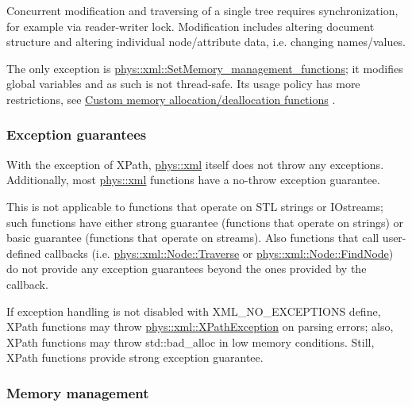 Concurrent modification and traversing of a single tree requires synchronization, for example via reader-\/writer lock. Modification includes altering document structure and altering individual node/attribute data, i.e. changing names/values. \par
 \par
 The only exception is \hyperlink{namespacephys_1_1xml_a2ad88e4331ac29a86c99d5e40b31f983}{phys::xml::SetMemory\_\-management\_\-functions}; it modifies global variables and as such is not thread-\/safe. Its usage policy has more restrictions, see \hyperlink{XMLManual_XMLCustomAlloc}{Custom memory allocation/deallocation functions} . \par
 \par
 \hypertarget{XMLManual_XMLExceptionSafety}{}\subsubsection{Exception guarantees}\label{XMLManual_XMLExceptionSafety}
With the exception of XPath, \hyperlink{namespacephys_1_1xml}{phys::xml} itself does not throw any exceptions. Additionally, most \hyperlink{namespacephys_1_1xml}{phys::xml} functions have a no-\/throw exception guarantee. \par
 \par
 This is not applicable to functions that operate on STL strings or IOstreams; such functions have either strong guarantee (functions that operate on strings) or basic guarantee (functions that operate on streams). Also functions that call user-\/defined callbacks (i.e. \hyperlink{classphys_1_1xml_1_1Node_a0029d08d3689c36d882ada0c0c9cf6e9}{phys::xml::Node::Traverse} or \hyperlink{classphys_1_1xml_1_1Node_ab2311cefdf1d7f4886cbebd7350d7731}{phys::xml::Node::FindNode}) do not provide any exception guarantees beyond the ones provided by the callback. \par
 \par
 If exception handling is not disabled with XML\_\-NO\_\-EXCEPTIONS define, XPath functions may throw \hyperlink{classphys_1_1xml_1_1XPathException}{phys::xml::XPathException} on parsing errors; also, XPath functions may throw std::bad\_\-alloc in low memory conditions. Still, XPath functions provide strong exception guarantee. \par
 \par
 \hypertarget{XMLManual_XMLMemory}{}\subsubsection{Memory management}\label{XMLManual_XMLMemory}
